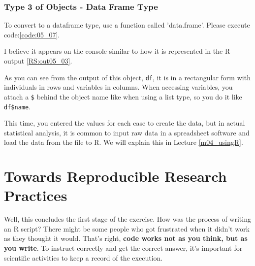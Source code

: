 \documentclass{ltjsbook}
\begin{document}
\subsubsection{Type 3 of Objects - Data Frame Type}
To convert to a dataframe type, use a function called 'data.frame'. Please execute code:\ref{code:05_07}.


I believe it appears on the console similar to how it is represented in the R output \ref{RS:out05_03}.

As you can see from the output of this object, \texttt{df}, it is in a rectangular form with individuals in rows and variables in columns. When accessing variables, you attach a \verb|$| behind the object name like when using a list type, so you do it like \verb|df$name|.

This time, you entered the values for each case to create the data, but in actual statistical analysis, it is common to input raw data in a spreadsheet software and load the data from the file to R. We will explain this in Lecture \ref{m04_usingR}.


\section{Towards Reproducible Research Practices}
\label{reproducibility}

Well, this concludes the first stage of the exercise.
How was the process of writing an R script? There might be some people who got frustrated when it didn't work as they thought it would. That's right, \textbf{code works not as you think, but as you write}. To instruct correctly and get the correct answer, it's important for scientific activities to keep a record of the execution.
\end{document}
